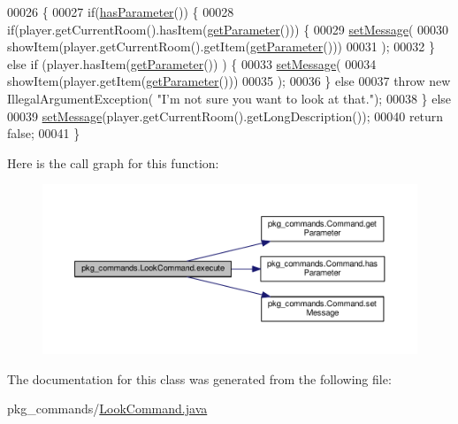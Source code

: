 \begin{DoxyCode}
00026                                                                           \{
00027         \textcolor{keywordflow}{if}(\hyperlink{classpkg__commands_1_1Command_a02af95ab3f1898a66259ab7c177b6998}{hasParameter}()) \{
00028             \textcolor{keywordflow}{if}(player.getCurrentRoom().hasItem(\hyperlink{classpkg__commands_1_1Command_a41c92d445be73ea9d62320c65efb8434}{getParameter}())) \{
00029                 \hyperlink{classpkg__commands_1_1Command_ae210ff216fe908b111ba1c988a963d13}{setMessage}(
00030                         showItem(player.getCurrentRoom().getItem(\hyperlink{classpkg__commands_1_1Command_a41c92d445be73ea9d62320c65efb8434}{getParameter}()))
00031                         );
00032             \} \textcolor{keywordflow}{else} \textcolor{keywordflow}{if} (player.hasItem(\hyperlink{classpkg__commands_1_1Command_a41c92d445be73ea9d62320c65efb8434}{getParameter}()) ) \{
00033                 \hyperlink{classpkg__commands_1_1Command_ae210ff216fe908b111ba1c988a963d13}{setMessage}(
00034                         showItem(player.getItem(\hyperlink{classpkg__commands_1_1Command_a41c92d445be73ea9d62320c65efb8434}{getParameter}()))
00035                         );
00036             \} \textcolor{keywordflow}{else}
00037                 \textcolor{keywordflow}{throw} \textcolor{keyword}{new} IllegalArgumentException( \textcolor{stringliteral}{"I'm not sure you want to look at that."});
00038         \} \textcolor{keywordflow}{else}
00039             \hyperlink{classpkg__commands_1_1Command_ae210ff216fe908b111ba1c988a963d13}{setMessage}(player.getCurrentRoom().getLongDescription());
00040         \textcolor{keywordflow}{return} \textcolor{keyword}{false};
00041     \}
\end{DoxyCode}


Here is the call graph for this function\-:
\nopagebreak
\begin{figure}[H]
\begin{center}
\leavevmode
\includegraphics[width=350pt]{classpkg__commands_1_1LookCommand_af336146fae1e14bf434d85a5acbcdcd7_cgraph}
\end{center}
\end{figure}




The documentation for this class was generated from the following file\-:\begin{DoxyCompactItemize}
\item 
pkg\-\_\-commands/\hyperlink{LookCommand_8java}{Look\-Command.\-java}\end{DoxyCompactItemize}

